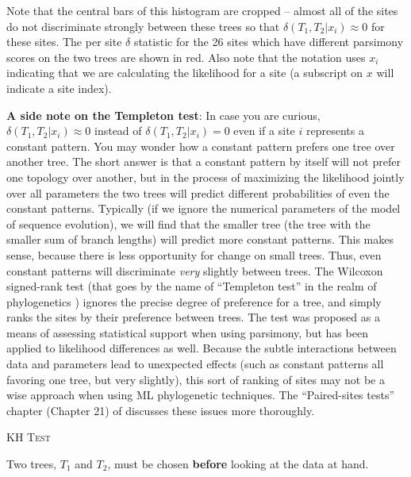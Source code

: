 \documentclass[11pt]{article}
\renewcommand{\section}[2]{%
\bigskip
\begin{center}
\begin{Large}
\normalfont\scshape #2
\medskip
\end{Large}
\end{center}}
\renewcommand{\subsubsection}[1]{%
\noindent\textbf{#1}:}
\begin{document}
Note that the central bars of this histogram are cropped -- almost all of the sites do not discriminate strongly between these trees so that $\delta(T_1,T_2|x_i)\approx0$ for these sites.
The per site $\delta$ statistic for the 26 sites which have different parsimony scores on the two trees are shown in red.
Also note that the notation uses $x_i$ indicating that we are calculating the likelihood for a site (a subscript on $x$ will indicate a site index).  

\subsubsection{A side note on the Templeton test} In case you are curious, $\delta(T_1,T_2|x_i)\approx0$ instead of $\delta(T_1,T_2|x_i)=0$ even if a site $i$ represents a constant pattern.
You may wonder how a constant pattern prefers one tree over another tree.
The short answer is that a constant pattern by itself will not prefer one topology over another, but in the process of maximizing the likelihood jointly over all parameters the two trees will predict different probabilities of even the constant patterns.
Typically (if we ignore the numerical parameters of the model of sequence evolution), we will find that the smaller tree (the tree with the smaller sum of branch lengths) will predict more constant patterns.
This makes sense, because there is less opportunity for change on small trees.
Thus, even constant patterns will discriminate {\em very} slightly between trees.
The Wilcoxon signed-rank test (that goes by the name of ``Templeton test'' in the realm of phylogenetics \citep{Templeton1983}) ignores the precise degree of preference for a tree, and simply ranks the sites by their preference between trees.
The test was proposed as a means of assessing statistical support when using parsimony, but has been applied to likelihood differences as well.
Because the subtle interactions between data and parameters lead to unexpected effects (such as constant patterns all favoring one tree, but very slightly), this sort of ranking of sites may not be a wise approach when using ML phylogenetic techniques.
The ``Paired-sites tests'' chapter (Chapter 21) of \citep{Felsenstein2004} discusses these issues more thoroughly.


\newpage
\section*{KH Test \citep{KishinoH1989} }
Two trees, $T_1$ and $T_2$, must be chosen {\bf before} looking at the data at hand.
\end{document}
